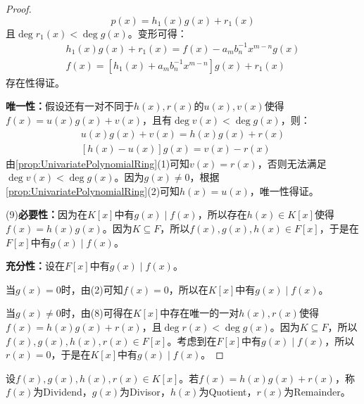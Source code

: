\begin{proof}
	\begin{equation*}
		p(x)=h_1(x)g(x)+r_1(x)
	\end{equation*}
	且$\deg r_1(x)<\deg g(x)$。变形可得：
	\begin{gather*}
		h_1(x)g(x)+r_1(x)=f(x)-a_mb_n^{-1}x^{m-n}g(x) \\
		f(x)=[h_1(x)+a_mb_n^{-1}x^{m-n}]g(x)+r_1(x)
	\end{gather*}
	存在性得证。\par
	\textbf{唯一性：}假设还有一对不同于$h(x),r(x)$的$u(x),v(x)$使得$f(x)=u(x)g(x)+v(x)$，且有$\deg v(x)<\deg g(x)$，则：
	\begin{gather*}
		u(x)g(x)+v(x)=h(x)g(x)+r(x) \\
		[h(x)-u(x)]g(x)=v(x)-r(x)
	\end{gather*}
	由\cref{prop:UnivariatePolynomialRing}(1)可知$v(x)=r(x)$，否则无法满足$\deg v(x)<\deg g(x)$。因为$g(x)\ne0$，根据\cref{prop:UnivariatePolynomialRing}(2)可知$h(x)=u(x)$，唯一性得证。\par
	(9)\textbf{必要性：}因为在$K[x]$中有$g(x)\mid f(x)$，所以存在$h(x)\in K[x]$使得$f(x)=h(x)g(x)$。因为$K\subseteq F$，所以$f(x),g(x),h(x)\in F[x]$，于是在$F[x]$中有$g(x)\mid f(x)$。\par
	\textbf{充分性：}设在$F[x]$中有$g(x)\mid f(x)$。\par
	当$g(x)=0$时，由(2)可知$f(x)=0$，所以在$K[x]$中有$g(x)\mid f(x)$。\par
	当$g(x)\ne0$时，由(8)可得在$K[x]$中存在唯一的一对$h(x),r(x)$使得$f(x)=h(x)g(x)+r(x)$，且$\deg r(x)<\deg g(x)$。因为$K\subseteq F$，所以$f(x),g(x),h(x),r(x)\in F[x]$。考虑到在$F[x]$中有$g(x)\mid f(x)$，所以$r(x)=0$，于是在$K[x]$中有$g(x)\mid f(x)$。
\end{proof}
\begin{definition}
		设$f(x),g(x),h(x),r(x)\in K[x]$。若$f(x)=h(x)g(x)+r(x)$，称$f(x)$为\gls{Dividend}，$g(x)$为\gls{Divisor}，$h(x)$为\gls{Quotient}，$r(x)$为\gls{Remainder}。
\end{definition}
